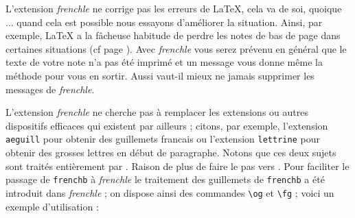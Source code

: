 \documentclass[a4paper,12pt,openright]{article}
\begin{document}
L’extension \textit{frenchle} ne corrige pas les erreurs de \LaTeX, cela va de soi,
quoique ... quand cela est possible nous essayons d’améliorer la situation. Ainsi, par
exemple, \LaTeX{} a la fâcheuse habitude de perdre les notes de bas de page dans
certaines situations (cf page \pageref{notesfigu}). Avec \textit{frenchle} vous serez prévenu en général que
le texte de votre note n’a pas été imprimé et un message vous donne même la méthode
pour vous en sortir. Aussi vaut-il mieux ne jamais supprimer les messages de
\textit{frenchle}.

L’extension \textit{frenchle} ne cherche pas à remplacer les extensions ou autres dispositifs
efficaces qui existent par ailleurs ; citons, par exemple, l’extension \texttt{aeguill}
pour obtenir des guillemets francais ou l’extension \texttt{lettrine} pour obtenir des
grosses lettres en début de paragraphe. Notons que ces deux sujets sont traités
entièrement par \textsl{\befr} .
Raison de plus de faire le pas vers \textsl{\befr} .
Pour faciliter le passage de  \texttt{frenchb} à \textit{frenchle} le traitement des guillemets
de  \texttt{frenchb} a été introduit dans \textit{frenchle} ; on dispose ainsi des commandes \verb|\og|
et \verb|\fg| ; voici un exemple d’utilisation :
\end{document}
